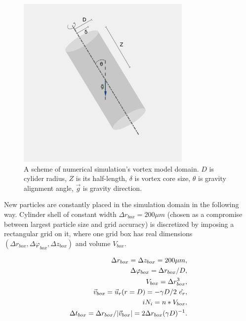 \documentclass[../main.tex]{subfiles}
\begin{document}
\begin{figure}
\centering
\noindent \includegraphics[width=20pc]{gfx/vortex_domain.png}
\caption{A scheme of numerical simulation's vortex model domain. $D$ is cylider radius, $Z$ is its half-length, $\delta$ is vortex core size, $\theta$ is gravity alignment angle, $\vec{g}$ is gravity direction.}
\label{fig:ch2_05}
\end{figure}
New particles are constantly placed in the simulation domain in the following way. Cylinder shell of constant width $\Delta r_{box}=200 \mu m$ (chosen as a compromise between largest particle size and grid accuracy) is discretized by imposing a rectangular grid on it, where one grid box has real dimensions $(\Delta r_{box},\Delta \varphi_{box},\Delta z_{box})$ and volume $V_{box}$.

\begin{align}
\Delta r_{box}=\Delta z_{box}=200 \mu m, \\
\Delta \varphi_{box}= \Delta r_{box}/D,\\
V_{box}=\Delta r_{box}^3,\\
\vec{v}_{box}=\vec{u}_r(r=D)=-\gamma D/2 \ \hat{e_r},\\
\/i N_i=n*V_{box},\\
\Delta t_{box}=\Delta r_{box}/|\vec{v}_{box}|=2 \Delta r_{box}(\gamma D)^{-1}.
\end{align}
\end{document}
